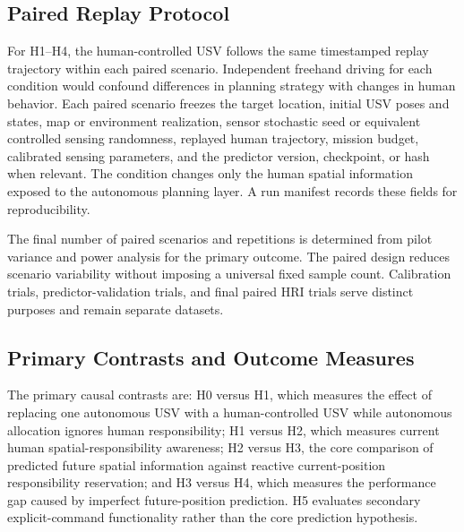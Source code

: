 \documentclass[letterpaper, 10pt, conference]{ieeeconf}
\begin{document}
\subsection{Paired Replay Protocol}

For H1--H4, the human-controlled USV follows the same timestamped replay trajectory within each paired scenario. Independent freehand driving for each condition would confound differences in planning strategy with changes in human behavior. Each paired scenario freezes the target location, initial USV poses and states, map or environment realization, sensor stochastic seed or equivalent controlled sensing randomness, replayed human trajectory, mission budget, calibrated sensing parameters, and the predictor version, checkpoint, or hash when relevant. The condition changes only the human spatial information exposed to the autonomous planning layer. A run manifest records these fields for reproducibility.

The final number of paired scenarios and repetitions is determined from pilot variance and power analysis for the primary outcome. The paired design reduces scenario variability without imposing a universal fixed sample count. Calibration trials, predictor-validation trials, and final paired HRI trials serve distinct purposes and remain separate datasets.

\subsection{Primary Contrasts and Outcome Measures}

The primary causal contrasts are: H0 versus H1, which measures the effect of replacing one autonomous USV with a human-controlled USV while autonomous allocation ignores human responsibility; H1 versus H2, which measures current human spatial-responsibility awareness; H2 versus H3, the core comparison of predicted future spatial information against reactive current-position responsibility reservation; and H3 versus H4, which measures the performance gap caused by imperfect future-position prediction. H5 evaluates secondary explicit-command functionality rather than the core prediction hypothesis.
\end{document}
